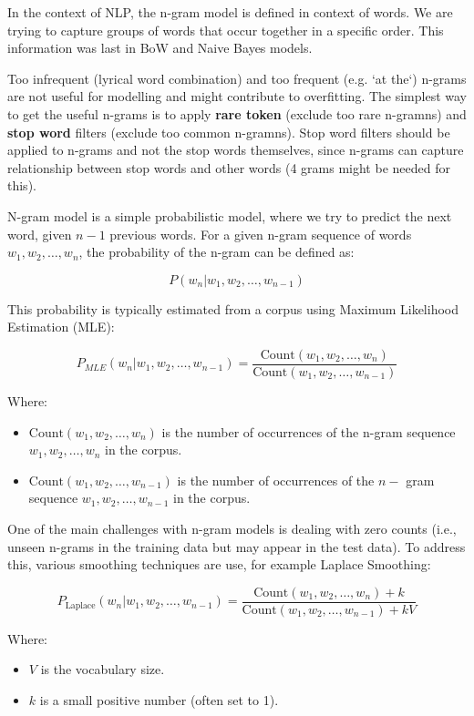 In the context of NLP, the n-gram model is defined in context of words. We are trying to capture groups of words that occur together in a specific order. This information was last in BoW and Naive Bayes models.

Too infrequent (lyrical word combination) and too frequent (e.g. `at the`) n-grams are not useful for modelling and might contribute to overfitting. The simplest way to get the useful n-grams is to apply \textbf{rare token} (exclude too rare n-gramns) and \textbf{stop word} filters (exclude too common n-gramns). Stop word filters should be applied to n-grams and not the stop words themselves, since n-grams can capture relationship between stop words and other words (4 grams might be needed for this).

N-gram model is a simple probabilistic model, where we try to predict the next word, given \(n-1\) previous words. For a given n-gram sequence of words \(w_1, w_2, \ldots, w_n\), the probability of the n-gram can be defined as:

\[P(w_n | w_1, w_2, \ldots, w_{n-1})\]

This probability is typically estimated from a corpus using Maximum Likelihood Estimation (MLE):

\[P_{MLE}(w_n | w_1, w_2, \ldots, w_{n-1}) = \frac{\text{Count}(w_1, w_2, \ldots, w_n)}{\text{Count}(w_1, w_2, \ldots, w_{n-1})}\]

Where:
\begin{itemize}
    \item \(\text{Count}(w_1, w_2, \ldots, w_n)\) is the number of occurrences of the n-gram sequence \(w_1, w_2, \ldots, w_n\) in the corpus.
    \item \(\text{Count}(w_1, w_2, \ldots, w_{n-1})\) is the number of occurrences of the \(n-\) gram sequence \(w_1, w_2, \ldots, w_{n-1}\) in the corpus.
\end{itemize}

One of the main challenges with n-gram models is dealing with zero counts (i.e., unseen n-grams in the training data but may appear in the test data). To address this, various smoothing techniques are use, for example Laplace Smoothing:

\[P_{\text{Laplace}}(w_n | w_1, w_2, \ldots, w_{n-1}) = \frac{\text{Count}(w_1, w_2, \ldots, w_n) + k}{\text{Count}(w_1, w_2, \ldots, w_{n-1}) + k V}\]

Where:
\begin{itemize}
    \item \(V\) is the vocabulary size.
    \item \(k\) is a small positive number (often set to 1).
\end{itemize}

